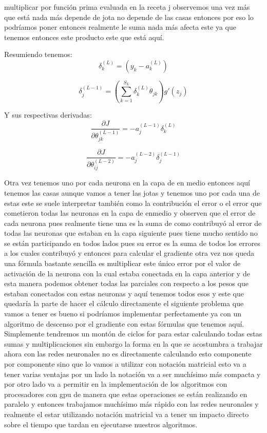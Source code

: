 multiplicar por función prima evaluada en la receta j observemos una vez más que está nada más depende de jota no depende de las casas entonces por eso lo podríamos poner entonces realmente le suma nada más afecta este ya que tenemos entonces este producto este que está aquí.

Resumiendo tenemos:
\begin{equation}
 \delta_{k}^{(L)} = (y_{k}-a_{k}^{(L)})
\end{equation}

\begin{equation}
 \delta_{j}^{(L-1)} = \left( \sum_{k=1}^{S_{L}} \delta_{k}^{(L)} \theta_{jk}\right)g'(z_j)
\end{equation}

Y sus respectivas derivadas:
\begin{equation}
 \dfrac{\partial J}{\partial \theta_{jk}^{(L-1)}} = -a_{j}^{(L-1)}\delta_{k}^{(L)}
\end{equation}

\begin{equation}
 \dfrac{\partial J}{\partial \theta_{ij}^{(L-2)}} = -a_{j}^{(L-2)}\delta_{j}^{(L-1)}
\end{equation}

Otra vez tenemos uno por cada neurona en la capa de en medio entonces aquí tenemos las casas aunque vamos a tener las jotas y tenemos uno por cada una de estas este se suele interpretar también como la contribución el error o el error que cometieron todas las neuronas en la capa de enmedio y observen que el error de cada neurona pues realmente tiene una es la suma de como contribuyó al error de todas las neuronas que estaban en la capa siguiente pues tiene mucho sentido no se están participando en todos lados pues su error es la suma de todos los errores a los cuales contribuyó y entonces para calcular el gradiente otra vez nos queda una fórmula bastante sencilla es multiplicar este único error por el valor de activación de la neurona con la cual estaba conectada en la capa anterior y de esta manera podemos obtener todas las parciales con respecto a los pesos que estaban conectados con estas neuronas y aquí tenemos todos esos y este que quedaría la parte de hacer el cálculo directamente el siguiente problema que vamos a tener es bueno si podríamos implementar perfectamente ya con un algoritmo de descenso por el gradiente con estas fórmulas que tenemos aquí. Simplemente tendremos un montón de ciclos for para estar calculando todas estas sumas y multiplicaciones sin embargo la forma en la que se acostumbra a trabajar ahora con las redes neuronales no es directamente calculando esto componente por componente sino que lo vamos a utilizar con notación matricial esto va a tener varias ventajas por un lado la notación va a ser muchísimo más compacta y por otro lado va a permitir en la implementación de los algoritmos con procesadores con gpu de manera que estas operaciones se están realizando en paralelo y entonces trabajamos muchísimo más rápido con las redes neuronales y realmente el estar utilizando notación matricial va a tener un impacto directo sobre el tiempo que tardan en ejecutarse nuestros algoritmos. 
